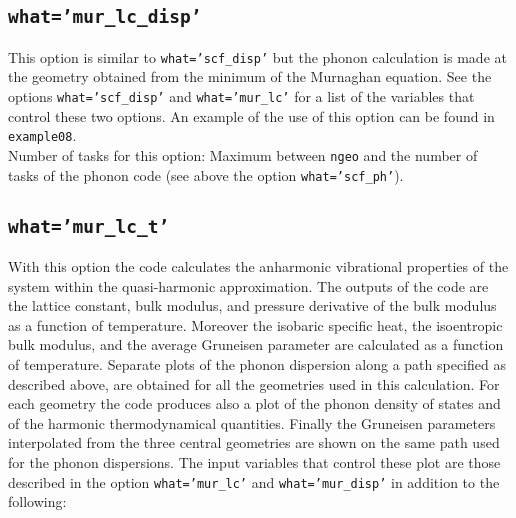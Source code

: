 \documentclass[12pt,a4paper]{article}
\begin{document}
\subsection{\texttt{what='mur\_lc\_disp'}}
This option is similar to \texttt{what='scf\_disp'} but the phonon calculation
is made at the geometry obtained from the minimum of the Murnaghan equation.
See the options \texttt{what='scf\_disp'} and \texttt{what='mur\_lc'} for a
list of the variables that control these two options. 
An example of the use of this option can be found in \texttt{example08}. \\
Number of tasks for this option: Maximum between \texttt{ngeo} and the number
of tasks of the phonon code (see above the option \texttt{what='scf\_ph'}).

\subsection{\texttt{what='mur\_lc\_t'}}
With this option the code calculates the anharmonic vibrational
properties of the system within the quasi-harmonic approximation. The
outputs of the code are the lattice constant, bulk modulus, and pressure
derivative of the bulk modulus as a function of temperature. Moreover
the isobaric specific heat, the isoentropic bulk modulus, and the average 
Gruneisen parameter are calculated as a function of temperature. Separate
plots of the phonon dispersion along a path specified as described above,
are obtained for all the geometries used in this calculation. For each
geometry the code produces also a plot of the phonon density of states
and of the harmonic thermodynamical quantities. Finally the Gruneisen
parameters interpolated from the three central geometries are
shown on the same path used for the phonon dispersions. The input variables
that control these plot are those described in the option
\texttt{what='mur\_lc'} and \texttt{what='mur\_disp'} in addition to the 
following:
\end{document}
